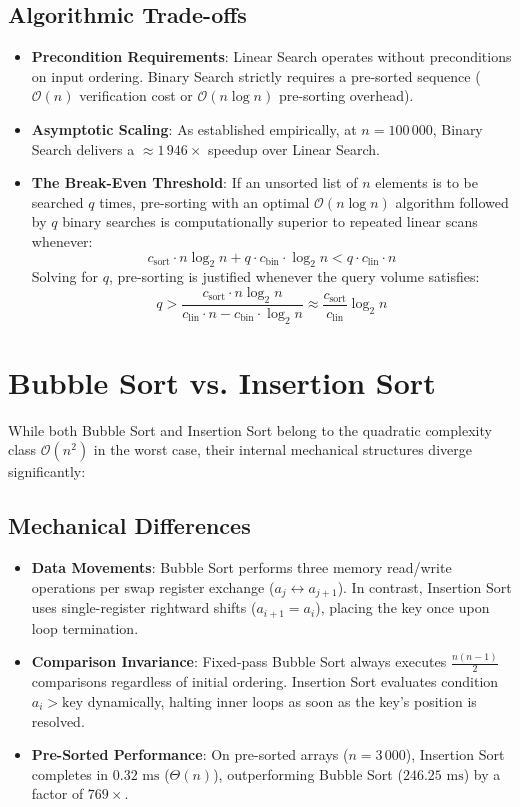 \documentclass[11pt,a4paper,oneside]{report}
\theoremstyle{definition}
\begin{document}
\subsection{Algorithmic Trade-offs}
\begin{itemize}
    \item \textbf{Precondition Requirements}: Linear Search operates without preconditions on input ordering. Binary Search strictly requires a pre-sorted sequence ($\mathcal{O}(n)$ verification cost or $\mathcal{O}(n \log n)$ pre-sorting overhead).
    \item \textbf{Asymptotic Scaling}: As established empirically, at $n = 100\,000$, Binary Search delivers a $\approx 1\,946\times$ speedup over Linear Search.
    \item \textbf{The Break-Even Threshold}: If an unsorted list of $n$ elements is to be searched $q$ times, pre-sorting with an optimal $\mathcal{O}(n \log n)$ algorithm followed by $q$ binary searches is computationally superior to repeated linear scans whenever:
    $$c_{\text{sort}} \cdot n \log_2 n + q \cdot c_{\text{bin}} \cdot \log_2 n < q \cdot c_{\text{lin}} \cdot n$$
    Solving for $q$, pre-sorting is justified whenever the query volume satisfies:
    $$q > \frac{c_{\text{sort}} \cdot n \log_2 n}{c_{\text{lin}} \cdot n - c_{\text{bin}} \cdot \log_2 n} \approx \frac{c_{\text{sort}}}{c_{\text{lin}}} \log_2 n$$
\end{itemize}

\section{Bubble Sort vs. Insertion Sort}
While both Bubble Sort and Insertion Sort belong to the quadratic complexity class $\mathcal{O}(n^2)$ in the worst case, their internal mechanical structures diverge significantly:

\subsection{Mechanical Differences}
\begin{itemize}
    \item \textbf{Data Movements}: Bubble Sort performs three memory read/write operations per swap register exchange ($a_j \leftrightarrow a_{j+1}$). In contrast, Insertion Sort uses single-register rightward shifts ($a_{i+1} = a_i$), placing the key once upon loop termination.
    \item \textbf{Comparison Invariance}: Fixed-pass Bubble Sort always executes $\frac{n(n-1)}{2}$ comparisons regardless of initial ordering. Insertion Sort evaluates condition $a_i > \text{key}$ dynamically, halting inner loops as soon as the key's position is resolved.
    \item \textbf{Pre-Sorted Performance}: On pre-sorted arrays ($n = 3\,000$), Insertion Sort completes in $0.32\text{ ms}$ ($\Theta(n)$), outperforming Bubble Sort ($246.25\text{ ms}$) by a factor of \textbf{$769\times$}.
\end{itemize}
\end{document}
